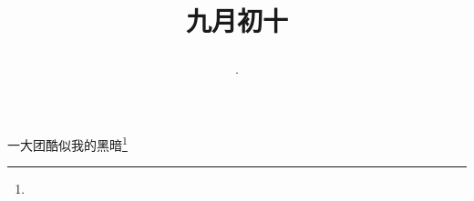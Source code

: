 \title{\date[d=12,m=10,y=2024][year:cn-y,年,month:cn,day:cn,日,·,weekday]·九月初十 }
一大团酷似我的黑暗\footnote{ }

